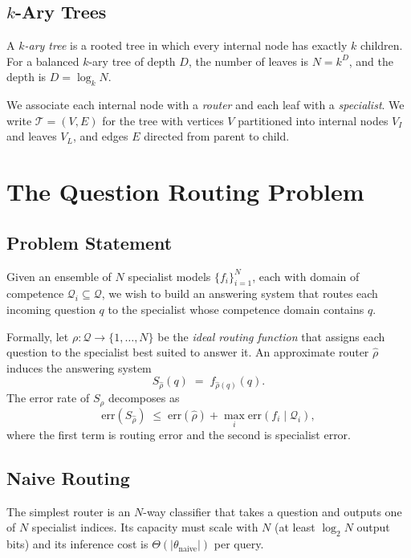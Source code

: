 \documentclass[11pt,twocolumn,a4paper]{article}
\theoremstyle{definition}
\theoremstyle{remark}
\newcommand{\Qc}{\mathcal{Q}}
\begin{document}
\subsection{$k$-Ary Trees}

A \emph{$k$-ary tree} is a rooted tree in which every internal node has exactly $k$ children. For a balanced $k$-ary tree of depth $D$, the number of leaves is $N = k^D$, and the depth is $D = \log_k N$.

We associate each internal node with a \emph{router} and each leaf with a \emph{specialist}. We write $\mathcal{T} = (V, E)$ for the tree with vertices $V$ partitioned into internal nodes $V_I$ and leaves $V_L$, and edges $E$ directed from parent to child.

\section{The Question Routing Problem}
\label{sec:problem}

\subsection{Problem Statement}

Given an ensemble of $N$ specialist models $\{f_i\}_{i=1}^N$, each with domain of competence $\mathcal{Q}_i \subseteq \Qc$, we wish to build an answering system that routes each incoming question $q$ to the specialist whose competence domain contains $q$.

Formally, let $\rho: \Qc \to \{1, \ldots, N\}$ be the \emph{ideal routing function} that assigns each question to the specialist best suited to answer it. An approximate router $\hat\rho$ induces the answering system
\[
S_{\hat\rho}(q) \;=\; f_{\hat\rho(q)}(q).
\]
The error rate of $S_{\hat\rho}$ decomposes as
\[
\mathrm{err}(S_{\hat\rho}) \;\leq\; \mathrm{err}(\hat\rho) + \max_i \mathrm{err}(f_i \mid \mathcal{Q}_i),
\]
where the first term is routing error and the second is specialist error.

\subsection{Naive Routing}

The simplest router is an $N$-way classifier that takes a question and outputs one of $N$ specialist indices. Its capacity must scale with $N$ (at least $\log_2 N$ output bits) and its inference cost is $\Theta(|\theta_{\mathrm{naive}}|)$ per query.
\end{document}
